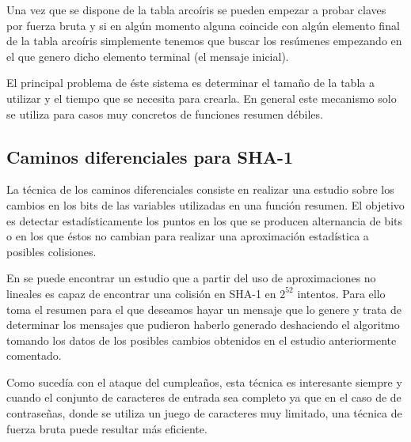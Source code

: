 Una vez que se dispone de la tabla arcoíris se pueden empezar a probar claves por fuerza bruta y si en algún momento alguna coincide con algún elemento final de la tabla arcoíris simplemente tenemos que buscar los resúmenes empezando en el que genero dicho elemento terminal (el mensaje inicial).

El principal problema de éste sistema es determinar el tamaño de la tabla a utilizar y el tiempo que se necesita para crearla. En general este mecanismo solo se utiliza para casos muy concretos de funciones resumen débiles.

\subsection{Caminos diferenciales para SHA-1}

La técnica de los caminos diferenciales consiste en realizar una estudio sobre los cambios en los bits de las variables utilizadas en una función resumen. El objetivo es detectar estadísticamente los puntos en los que se producen alternancia de bits o en los que éstos no cambian para realizar una aproximación estadística a posibles colisiones.

En \cite{citeulike:7684257} se puede encontrar un estudio que a partir del uso de aproximaciones no lineales es capaz de encontrar una colisión en SHA-1 en $2^{52}$ intentos. Para ello toma el resumen para el que deseamos hayar un mensaje que lo genere y trata de determinar los mensajes que pudieron haberlo generado deshaciendo el algoritmo tomando los datos de los posibles cambios obtenidos en el estudio anteriormente comentado.

Como sucedía con el ataque del cumpleaños, esta técnica es interesante siempre y cuando el conjunto de caracteres de entrada sea completo ya que en el caso de de contraseñas, donde se utiliza un juego de caracteres muy limitado, una técnica de fuerza bruta puede resultar más eficiente.


